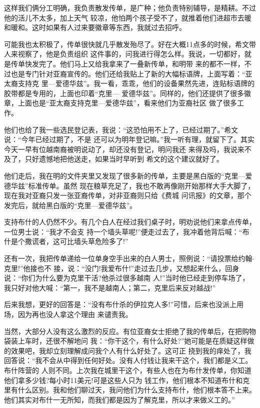 ﻿\documentclass[11pt]{article}
\begin{document}
这样我们俩分工明确，我负责散发传单，是广种；他负责特别辅导，是精耕。不过他的活儿不太多，加上天气
较凉，他怕两个孩子受不了，就推着他们进超市去暖和暖和。这时如果有人过来要徽章等东西，我就过去招呼。


可能我也太积极了，传单很快就几乎散发殆尽了。好在大概11点多的时候，希文带人来视察了，他是负责组织
这件事的，问我进行得怎么样。我说，一切都好，就是传单快发完了。他们马上又给我拿来了一叠新传单，和明带
来的都不一样，不过也是专门针对亚裔宣传的。他们还给我贴上了新的大幅标语牌，上面写着：``亚太裔支持克
里---爱德华兹''。我一看，乖乖，他们的设备果然先进，连贴标语牌的胶带都是专用的，上面也印着``克里---
爱德华兹''。同样的，他们还提供了很多徽章，上面也是``亚太裔支持克里---爱德华兹''，看来他们为亚裔社区
做了很多工作。

他们也给了我一些选民登记表，我说：``这恐怕用不上了，已经过期了。''希文说：``今年已经过期了，不是
还可以为明年登记嘛。''我一听有理，就留下了。其实今天一早有位越南裔被明说动了，却还没有登记，明问我还
来得及吗，我说来不及了，只好遗憾地把他送走，如果当时早听到 希文的这个建议就好了。

他们走后，我在明的文件夹里又发现了很多新的传单，主要是黑白版的``克里---爱德华兹''标准传单。虽然
现在粮草充足了，我也不敢再像刚开始那样大手大脚了，现在我对亚裔只发一张亚裔传单，对非亚裔则只给《费城
问讯报》的文章，那个发完后，就给黑白版的``克里---爱德华兹''。

支持布什的人仍然不少。有几个白人在经过我们桌子时，明劝说他们来拿点传单，一位男士说：``我才不会支
持一个墙头草呢!''便走过去了，我冲着他背后喊：``布什是个撒谎者，这可比墙头草危险多了!''

还有一次，我把传单递给一位单身空手出来的白人男士，照例说：``请投票给约翰$\cdot$克里!''他接也不
接，说：``没门!我爱布什!''走过去几步，又想起来什么，回身说：``你们为什么要为克里干活?他杀过很多越南
人!''当时他已经走到停车场了，我只好对他大喊：``第一，我不是越南人；第二，克里后来反对越战!''

后来我想，更好的回答是：``没有布什杀的伊拉克人多!''可惜，后来也没派上用场，因为再也没人拿这个理由
来谴责我。

当然，大部分人没有这么激烈的反应。有位亚裔女士拒绝了我的传单后，在把购物袋装上车时，还很不解地问
我：``你干这个，有什么好处?''她可能是在质疑这样做的效果吧，我却立刻理解成问我个人有什么好处了。这可正
挠到我的痒处了，我回答说：``我不会从中得到任何好处。没有人付钱让我来干这个，我们都是义工。布什阵营的
人则不同。上次我在城里干这个，有些人也在为布什发传单，你知道他们拿多少钱?每小时11美元!可是这些人只为
钱工作，他们根本不知道布什和克里有什么区别。我和他们聊过天，我问他们为什么支持布什，他们根本答不上来。
他们其实对布什一无所知，而我们都是因为了解克里，所以才来做义工的。''
\end{document}
